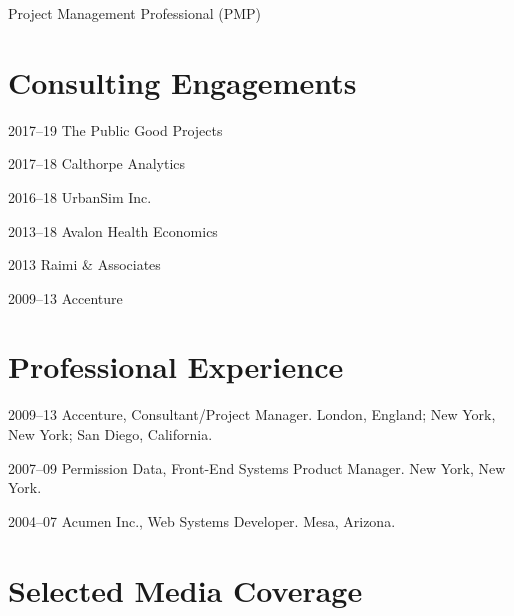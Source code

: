 \documentclass[12pt,letterpaper]{report}
\newcommand{\listitemspace}{0.15em}
\renewenvironment{itemize}
{\begin{list}{}{\setlength{\leftmargin}{0em}
			\setlength{\parskip}{0em}
			\setlength{\itemsep}{\listitemspace}
			\setlength{\parsep}{\listitemspace}}}
	{\end{list}}
\begin{document}
\begin{tablist}
\begin{itemize}
		\item Project Management Professional (PMP)
		
	\end{itemize}
	
	
	
	\section*{Consulting Engagements}
	
	\begin{tablist}
		
		\item[2017--19] \tab The Public Good Projects	
		
		\item[2017--18] \tab Calthorpe Analytics
		
		\item[2016--18] \tab UrbanSim Inc.
		
		\item[2013--18] \tab Avalon Health Economics
		
		\item[2013]     \tab Raimi \& Associates
		
		\item[2009--13] \tab Accenture
		
	\end{tablist}
	
	
	
	\section*{Professional Experience}
	
	\begin{tablist}
		
		\item[2009--13] \tab Accenture, Consultant/Project Manager. London, England; New York, New York; San Diego, California.
		
		\item[2007--09] \tab Permission Data, Front-End Systems Product Manager. New York, New York.
		
		\item[2004--07] \tab Acumen Inc., Web Systems Developer. Mesa, Arizona.
		
	\end{tablist}
	
	
	
	\section*{Selected Media Coverage}
	

\end{tablist}
\end{document}
